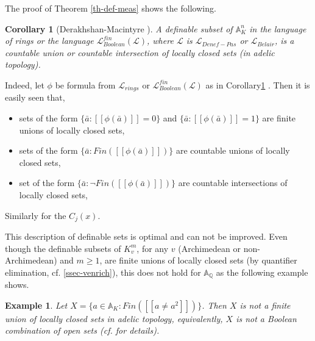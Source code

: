 \documentclass[12pt]{amsart}
\def\A{\mathbb{A}}
\def\cL{\mathcal{L}}
\def\Q{\mathbb{Q}}
\def\cL{\mathcal{L}}
\newtheorem{cor}{Corollary}[section]
\newtheorem{ex}{Example}[section]
\numberwithin{equation}{section}
\begin{document}
 The proof of Theorem \ref{th-def-meas} shows the following.

\begin{cor}[Derakhshan-Macintyre {\cite{DM-ad}}]\label{cor-def-loc-cl} A definable subset of $\A_K^n$ in the language of rings or the language $\cL_{Boolean}^{fin}(\cL)$, where $\cL$ is $\cL_{Denef-Pas}$ or $\cL_{Belair}$, is a countable union or countable intersection of locally closed sets (in adelic topology).
\end{cor}
Indeed, let $\phi$ be formula from $\cL_{rings}$ or $\cL_{Boolean}^{fin}(\cL)$ as in Corollary\ref{cor-def-loc-cl} . Then it is easily seen that,
\begin{itemize}
\item sets of the form $\{\bar a: [[\phi(\bar a)]]=0\}$ and $\{\bar a: [[\phi(\bar a)]]=1\}$ are finite unions of locally closed sets,

\item sets of the form $\{\bar a: Fin([[\phi(\bar a)]])\}$ are countable unions of locally closed sets,

\item  set of the form $\{\bar a: \neg Fin([[\phi(\bar a)]])\}$ are countable intersections of locally closed sets,
\end{itemize}
Similarly for the $C_j(x)$. 

                                                                                                                                                                                                                                                                                                                                                                                                                                                                                                                                                                                                                                                                                        
This description of definable sets is optimal and can not be improved. Even though the definable subsets of 
$K_v^m$, for any $v$ (Archimedean or non-Archimedean) and $m\geq 1$, are finite unions of locally closed sets 
(by quantifier elimination, cf. \ref{ssec-venrich}), this does not hold for $\A_{\Q}$ as the following example shows.

\begin{ex}\cite{DM-ad} Let $X=\{a\in \A_K: Fin([[a\neq a^2]])\}$. Then $X$ 
is not a finite union of locally closed sets in adelic topology, equivalently, $X$ is not 
a Boolean combination of open sets (cf. \cite{DM-ad} for details).
\end{ex}
\end{document}

